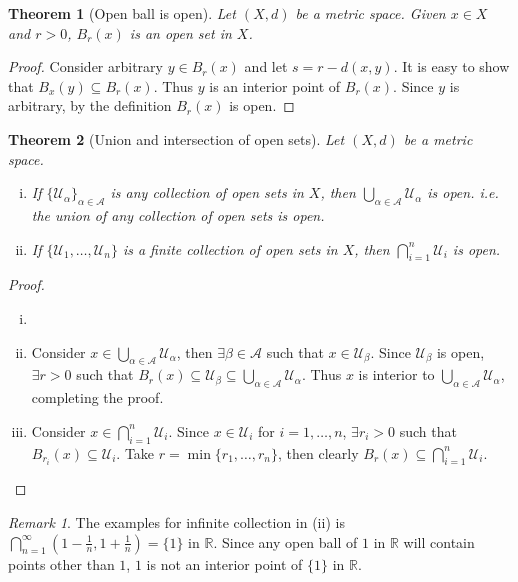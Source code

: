 \documentclass[12pt, lettersize]{article}
\theoremstyle{plain}
\newtheorem{thm}{Theorem}[section]
\theoremstyle{definition}
\theoremstyle{remark}
\newtheorem*{rem}{Remark}
\newcommand{\R}{\mathbb{R}}
\begin{document}
\begin{thm}[Open ball is open]
	Let $(X,d)$ be a metric space. Given $x\in X$ and $r>0$, $B_r(x)$ is an open set in $X$.
\end{thm}
\begin{proof}
	Consider arbitrary $y\in B_r(x)$ and let $s=r-d(x,y)$. It is easy to show that $B_x(y)\subseteq B_r(x)$. Thus $y$ is an interior point of $B_r(x)$. Since $y$ is arbitrary, by the definition $B_r(x)$ is open.
\end{proof}

\begin{thm}[Union and intersection of open sets]\label{thm: Union and intersection of open sets}
	Let $(X,d)$ be a metric space.
	\begin{enumerate}[(i)]
		\item If $\{\mathcal{U}_\alpha\}_{\alpha\in \mathcal{A}}$ is any collection of open sets in $X$, then $\bigcup_{\alpha\in \mathcal{A}}\mathcal{U}_\alpha$ is open. i.e. the union of \emph{any} collection of open sets is open.
		\item If $\{\mathcal{U}_1,\dots,\mathcal{U}_n\}$ is a finite collection of open sets in $X$, then $\bigcap_{i=1}^{n}\mathcal{U}_i$ is open.
	\end{enumerate}
\end{thm}
\begin{proof}
	\begin{enumerate}[(i)]
		\item[]
		\item Consider $x\in\bigcup_{\alpha\in \mathcal{A}}\mathcal{U}_\alpha$, then $\exists \beta\in\mathcal{A}$ such that $x\in\mathcal{U}_\beta$. Since $\mathcal{U}_\beta$ is open, $\exists r>0$ such that $B_r(x)\subseteq\mathcal{U}_\beta\subseteq\bigcup_{\alpha\in \mathcal{A}}\mathcal{U}_\alpha$. Thus $x$ is interior to $\bigcup_{\alpha\in \mathcal{A}}\mathcal{U}_\alpha$, completing the proof.
		\item Consider $x\in\bigcap_{i=1}^{n}\mathcal{U}_i$. Since $x\in\mathcal{U}_i$ for $i=1,\dots,n$, $\exists r_i>0$ such that $B_{r_i}(x)\subseteq\mathcal{U}_i$. Take $r=\min\{r_1,\dots,r_n\}$, then clearly $B_r(x)\subseteq\bigcap_{i=1}^{n}\mathcal{U}_i$.
	\end{enumerate}
\end{proof}
\begin{rem}
	The examples for infinite collection in (ii) is $\bigcap_{n=1}^{\infty}(1-\frac{1}{n}, 1+\frac{1}{n})=\{1\}$ in $\R$. Since any open ball of $1$ in $\R$ will contain points other than $1$, $1$ is not an interior point of $\{1\}$ in $\R$.  
\end{rem}
\end{document}
